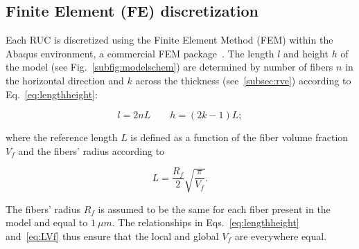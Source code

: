 \documentclass[review]{elsarticle}
\begin{document}
%

\subsection{Finite Element (FE) discretization}

Each RUC is discretized using the Finite Element Method (FEM) within the Abaqus environment, a commercial FEM package~\cite{abq12}. The length $l$ and height $h$ of the model (see Fig.~\ref{subfig:modelschem}) are determined by number of fibers $n$ in the horizontal direction and $k$ across the thickness (see~\ref{subsec:rve}) according to Eq.~\ref{eq:lengthheight}:

\begin{equation}\label{eq:lengthheight}
l=2nL\qquad h=\left(2k-1\right)L;
\end{equation}

where the reference length $L$ is defined as a function of the fiber volume fraction $V_{f}$ and the fibers' radius according to

\begin{equation}\label{eq:LVf}
L=\frac{R_{f}}{2}\sqrt{\frac{\pi}{V_{f}}}.
\end{equation}

The fibers' radius $R_{f}$ is assumed to be the same for each fiber present in the model and equal to $1\ \mu m$. The relationships in Eqs.~\ref{eq:lengthheight} and~\ref{eq:LVf} thus ensure that the local and global $V_{f}$ are everywhere equal. 
\end{document}
